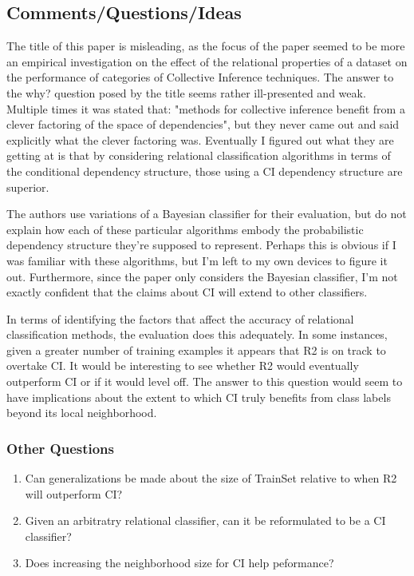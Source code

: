 \documentclass[11pt]{article}
\begin{document}
\subsection*{Comments/Questions/Ideas} 

The title of this paper is misleading, as the focus of the paper seemed to be more an empirical investigation on the effect of the relational properties of a dataset on the performance of categories of Collective Inference techniques.  The answer to the why? question posed by the title seems rather ill-presented and weak. Multiple times it was stated that: 
"methods for collective inference benefit from a clever factoring of the space of dependencies", 
but they never came out and said explicitly what the clever factoring was. Eventually I figured out 
what they are getting at is that by considering relational classification algorithms in terms 
of the conditional dependency structure, those using a CI dependency structure are superior. 

The authors use variations of a Bayesian classifier for their evaluation, but do not explain how each of these particular algorithms embody the probabilistic dependency structure they're supposed to represent. Perhaps this is obvious if I was familiar with these algorithms, but I'm left to my own devices to figure it out. Furthermore, since the paper only considers the Bayesian classifier, I'm not exactly confident that the claims about CI will extend to other classifiers.

In terms of identifying the factors that affect the accuracy of relational classification methods, the evaluation does this adequately. In some instances, given a greater number of training examples it appears that R2 is on track to overtake CI. It would be interesting to see whether R2 would eventually outperform CI or if it would level off. The answer to this question would seem to have implications about the extent to which CI truly benefits from class labels beyond its local neighborhood.

\subsubsection*{Other Questions}
\begin{enumerate}
	\item Can generalizations be made about the size of TrainSet relative to when R2 will outperform CI?
    \item Given an arbitratry relational classifier, can it be reformulated to be a CI classifier?
    \item Does increasing the neighborhood size for CI help peformance?
\end{enumerate}
\end{document}
